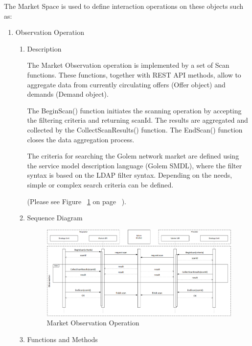 \break

The Market Space is used to define interaction operations on these objects such as:

\begin{enumerate}
\item  Observation Operation

\begin{enumerate}

\item Description

The Market Observation operation is implemented by a set of Scan functions. 
These functions, together with REST API methods, allow to aggregate data from currently circulating 
offers (Offer object) and demands (Demand object).

The BeginScan() function initiates the scanning operation by accepting the filtering criteria and 
returning scanId. The results are aggregated and collected by the CollectScanResults() function.
The EndScan() function closes the data aggregation process.

The criteria for searching the Golem network market are defined using the service model description language (Golem SMDL),
where the filter syntax is based on the LDAP filter syntax. Depending on the needs, simple or complex search criteria can be defined.

(Please see Figure ~\ref{fig:MOO} on page ~\pageref{fig:MOO}).

\item Sequence Diagram

\begin{figure}[htbp]
    \centering
    \includegraphics[width=14cm,angle=0]{./diag/Sequence/MarketObservation-B-Sequence.png}
	\caption{Market Observation Operation}
    \label{fig:MOO}
\end{figure}

\item Functions and Methods


\end{enumerate}
\end{enumerate}
